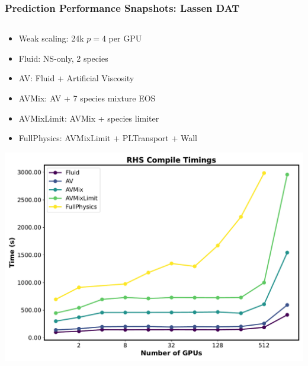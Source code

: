 \begin{frame}\frametitle{Prediction Performance Snapshots: Lassen DAT}
    \begin{columns}[T]  %
    \begin{column}{0.5\textwidth}
      \begin{itemize}
        \item Weak scaling: 24k $p=4$ per GPU
        \item Fluid: NS-only, 2 species
        \item AV: Fluid + Artificial Viscosity
        \item AVMix: AV + 7 species mixture EOS
        \item AVMixLimit: AVMix + species limiter
        \item FullPhysics: AVMixLimit + PLTransport + Wall
      \end{itemize}
      \includegraphics[width=.7\textwidth]{Figures/RHSCompileTimes.pdf}
    \end{column}
    

\end{columns}
\end{frame}
